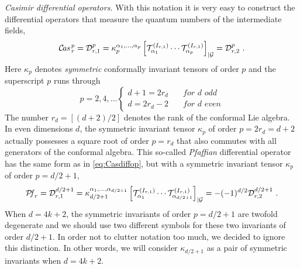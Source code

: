 \documentclass{article}
\def\cG{\mathcal{G}}
\begin{document}
\noindent 
\textit{Casimir differential operators.} 
With this notation it is very easy to construct the differential operators that measure 
the quantum numbers of the intermediate fields,  
\begin{equation} \label{eq:Casdiffop} 
\mathcal{C}\textit{\!as\,}^p_r = \mathcal{D}^{p}_{r,1}  =  
\kappa_p^{\alpha_1,\dots,\alpha_{p}}\left[\mathcal{T}^{(I_{r,1})}_{\alpha_1}
    \cdots \mathcal{T}^{(I_{r,1})}_{\alpha_p}\right]_{|\cG} = \mathcal{D}^p_{r,2}\ .       
\end{equation}
Here $\kappa_p$ denotes \textit{symmetric} conformally invariant tensors of order $p$ and 
the superscript $p$ runs through 
\begin{equation} 
p = 2, 4, \dots \left\{ \begin{array}{ll} d+1 = 2 r_d  \quad & \textit{for $d$ odd} \\[2mm]  
d = 2 r_d -2 \quad & \textit{for $d$ even} \end{array} \right. 
\end{equation} 
The number $r_d = [(d+2)/2]$ denotes the rank of the conformal Lie algebra. 
In even dimensions $d$, the symmetric invariant tensor $\kappa_p$ of order $p = 2r_d = d+2$ 
actually possesses a square root of order $p = r_d$ that also commutes with all generators of 
the conformal algebra. This so-called \textit{Pfaffian} differential operator has the same form 
as in \eqref{eq:Casdiffop}, but with a symmetric invariant tensor $\kappa_p$ of order $p=d/2+1$, 
\begin{equation} \label{eq:PfCasimir} 
\mathcal{P}\textit{\!f\,}_{r} = \mathcal{D}^{d/2+1}_{r,1} = 
    \kappa_{d/2+1}^{\alpha_1,\dots,\alpha_{d/2+1}} \left[\mathcal{T}^{(I_{r,1})}_{\alpha_1}
    \cdots \mathcal{T}^{(I_{r,1})}_{\alpha_{d/2+1}}\right]_{|\cG}  = - (-1)^{d/2} 
    \mathcal{D}^{d/2+1}_{r,2}\ . 
\end{equation} 
When $d=4k+2$, the symmetric invariants of order $p = d/2+1$ are twofold degenerate and we 
should use two different symbols for these two invariants of order $d/2+1$. In order not 
to clutter notation too much, we decided to ignore this distinction. In other words, we 
will consider $\kappa_{d/2+1}$ as a pair of symmetric invariants when $d=4k+2$.  
\end{document}
